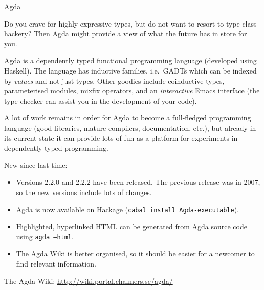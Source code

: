 \documentclass{article}
\begin{document}
\begin{hcarentry}[updated]{Agda}
\label{agda}
\makeheader

Do you crave for highly expressive types, but do not want to resort to
type-class hackery? Then Agda might provide a view of what the future
has in store for you.

Agda is a dependently typed functional programming language (developed
using Haskell). The language has inductive families, i.e.\ GADTs which
can be indexed by \emph{values} and not just types. Other goodies
include coinductive types, parameterised modules, mixfix operators,
and an \emph{interactive} Emacs interface (the type checker can assist
you in the development of your code).

A lot of work remains in order for Agda to become a full-fledged
programming language (good libraries, mature compilers, documentation,
etc.), but already in its current state it can provide lots of fun as
a platform for experiments in dependently typed programming.

New since last time:
\begin{itemize}
\item Versions 2.2.0 and 2.2.2 have been released. The previous
  release was in 2007, so the new versions include lots of changes.
\item Agda is now available on Hackage (\texttt{cabal install
    Agda-executable}).
\item Highlighted, hyperlinked HTML can be generated from Agda source
  code using \texttt{agda --html}.
\item The Agda Wiki is better organised, so it should be easier for a
  newcomer to find relevant information.
\end{itemize}

\FurtherReading
  The Agda Wiki: \url{http://wiki.portal.chalmers.se/agda/}
\end{hcarentry}
\end{document}
